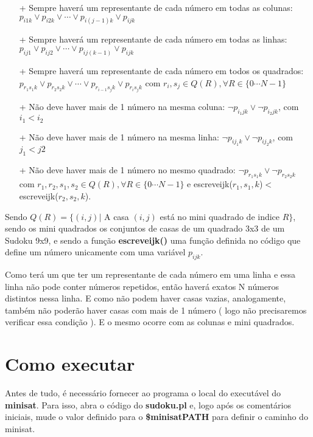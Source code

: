 \documentclass[11pt]{article}
\begin{document}
\begin{itemize}

 \item[+] Sempre haverá um representante de cada número em todas as colunas: $p_{i1k}\vee p_{i2k}\vee \cdots \vee p_{i(j-1)k}\vee p_{ijk}$
 \item[+] Sempre haverá um representante de cada número em todas as linhas:
 $p_{ij1}\vee p_{ij2}\vee \cdots \vee p_{ij(k-1)}\vee p_{ijk}$
 \item[+] Sempre haverá um representante de cada número em todos os quadrados:
 $p_{r_{1}s_{1}k}\vee p_{r_{2}s_{2}k}\vee \cdots \vee p_{r_{i-1}s_{j}k}\vee p_{r_{i}s_{j}k}$ com $r_{i}, s_{j} \in Q(R), \forall R \in \{0\cdots N-1\} $
 \item[+] Não deve haver mais de 1 número na mesma coluna:
 $\neg p_{i_{1}jk}\vee \neg p_{i_{2}jk}$, com $i_{1}<i_{2} $
 \item[+] Não deve haver mais de 1 número na mesma linha:
 $\neg p_{ij_{1}k}\vee \neg p_{ij_{2}k}  $, com $j_{1}<j{2} $
 \item[+] Não deve haver mais de 1 número no mesmo quadrado:
 $\neg p_{r_{1}s_{1}k}\vee \neg p_{r_{2}s_{2}k} $ com $r_{1},r_{2}, s_{1}, s_{2} \in Q(R), \forall R \in \{0\cdots N-1\}$ e escreveijk($r_{1},s_{1},k$)$<$ escreveijk($ r_{2},s_{2},k $).
 
 
\end{itemize}

Sendo $Q(R) = \{ (i,j) |$ A casa $(i,j)$ está no mini quadrado de indice $R \}$, sendo os mini quadrados os conjuntos de casas de um quadrado 3x3 de um Sudoku 9x9, e sendo a função \textbf{\color{red}escreveijk()} uma função definida no código que define um número unicamente com uma variável $p_{ijk}$.



Como terá um que ter um representante de cada número em uma linha e essa
 linha não pode conter números repetidos, então haverá exatos N números
 distintos nessa linha. E como não podem haver casas vazias, analogamente,
 também não poderão haver casas com mais de 1 número ( logo não precisaremos
 verificar essa condição ). E o mesmo ocorre com as colunas e mini quadrados.

\section{Como executar}

Antes de tudo, é necessário fornecer ao programa o local do executável do \textbf{\color{red}minisat}. Para isso, abra o código do \textbf{sudoku.pl} e, logo após os comentários iniciais, mude o valor definido para o \textbf{\${}minisatPATH} para definir o caminho do minisat.
\end{document}
